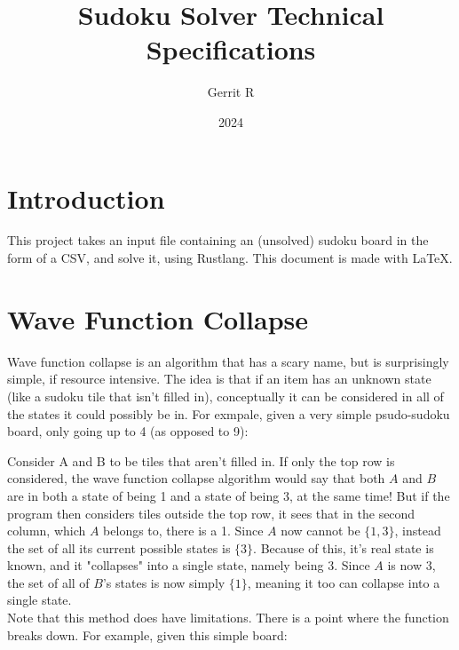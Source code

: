 \documentclass[11pt]{article}
\author{Gerrit R}
\title{Sudoku Solver Technical Specifications}
\date{2024}
\begin{document}
\maketitle
\section{Introduction}
This project takes an input file containing an 
(unsolved) sudoku board in the form of a CSV, and solve it, using Rustlang. This document is made with \LaTeX.

\section{Wave Function Collapse}
Wave function collapse is an algorithm that has a scary name, but 
is surprisingly simple, if resource intensive. The idea is that if 
an item has an unknown state (like a sudoku tile that isn't filled in), 
conceptually it can be considered in all of the states it could possibly be in.
For exmpale, given a very simple psudo-sudoku board, only going up to 4 (as opposed to 9):\\
\begin{center}
\end{center}
Consider A and B to be tiles that aren't filled in. If only the top row is considered, the wave
function collapse algorithm would say that both $A$ and $B$ are in both a state of being 1 
and a state of being 3, at the same time! But if the program then considers tiles outside the top row,
it sees that in the second column, which $A$ belongs to, there is a 1. Since $A$ now cannot be $\{1, 3\}$, 
instead the set of all its current possible states is $\{3\}$. Because of this, it's real state is known, and it 
"collapses" into a single state, namely being 3. Since $A$ is now 3, the set of all of $B$'s states is now simply
$\{1\}$, meaning it too can collapse into a single state. \\
Note that this method does have limitations. There is a point where the function breaks down. For example, given this simple board:
\end{document}
